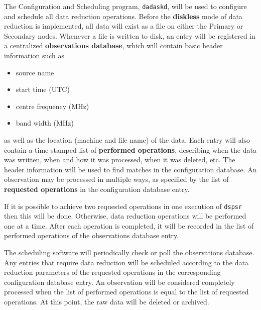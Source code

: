The Configuration and Scheduling program, {\tt dadaskd}, will be used
to configure and schedule all data reduction operations.  Before the
{\bf diskless} mode of data reduction is implemented, all data will
exist as a file on either the Primary or Secondary nodes.  Whenever a
file is written to disk, an entry will be registered in a centralized
{\bf observations database}, which will contain basic header
information such as
\begin{itemize}
\item source name

\item start time (UTC)

\item centre frequency (MHz)

\item band width (MHz)
\end{itemize}
as well as the location (machine and file name) of the data.  Each
entry will also contain a time-stamped list of {\bf performed
operations}, describing when the data was written, when and how it was
processed, when it was deleted, etc.  The header information will be
used to find matches in the configuration database.  An observation
may be processed in multiple ways, as specified by the list of {\bf
requested operations} in the configuration database entry.

If it is possible to achieve two requested operations in one execution
of {\tt dspsr} then this will be done.  Otherwise, data reduction
operations will be performed one at a time.  After each operation is
completed, it will be recorded in the list of performed operations of
the observations database entry.

The scheduling software will periodically check or poll the
observations database.  Any entries that require data reduction will
be scheduled according to the data reduction parameters of the
requested operations in the corresponding configuration database
entry.  An observation will be considered completely processed when
the list of performed operations is equal to the list of requested
operations.  At this point, the raw data will be deleted or archived.
